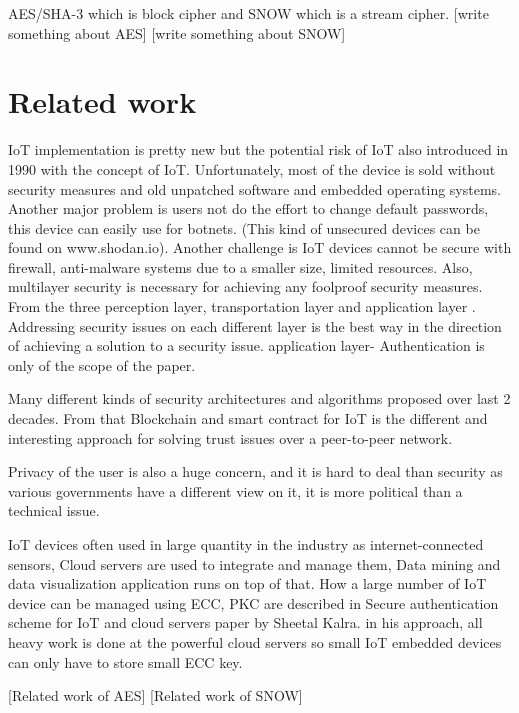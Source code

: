 \documentclass[preprint,10pt,5p]{elsarticle}
\begin{document}
AES/SHA-3  which is block cipher and SNOW which is a stream cipher. [write something about AES] [write something about SNOW]

\section{Related work}
IoT implementation is pretty new but the potential risk of IoT also introduced in 1990 with the concept of IoT.\cite{7165580} Unfortunately, most of the device is sold without security measures and old unpatched software and embedded operating systems. Another major problem is users not do the effort to change default passwords,  this device can easily use for botnets. (This kind of unsecured devices can be found on www.shodan.io). Another challenge is IoT devices cannot be secure with firewall, anti-malware systems due to a smaller size, limited resources. Also, multilayer security is necessary for achieving any foolproof security measures. From the three perception layer, transportation layer and application layer \cite{Yang2012}. 
Addressing security issues on each different layer is the best way in the direction of achieving a solution to a security issue. \cite{Jing2014} application layer- Authentication is only of the scope of the paper.  

Many different kinds of security architectures and algorithms proposed over last 2 decades. From that Blockchain and smart contract for IoT is the different and interesting approach for solving trust issues over a peer-to-peer network.\cite{christidis2016blockchains}

Privacy of the user is also a huge concern, and it is hard to deal than security as various governments have a different view on it, it is more political than a technical issue.\cite{Weber2010}

IoT devices often used in large quantity in the industry as internet-connected sensors, Cloud servers are used to integrate and manage them, Data mining and data visualization application runs on top of that.  How a large number of IoT device can be managed using ECC, PKC are described in Secure authentication scheme for IoT and cloud servers paper by Sheetal Kalra. in his approach, all heavy work is done at the powerful cloud servers so small IoT embedded devices can only have to store small ECC key. \cite{Kalra2015}

[Related work of AES]
[Related work of SNOW]


\end{document}
